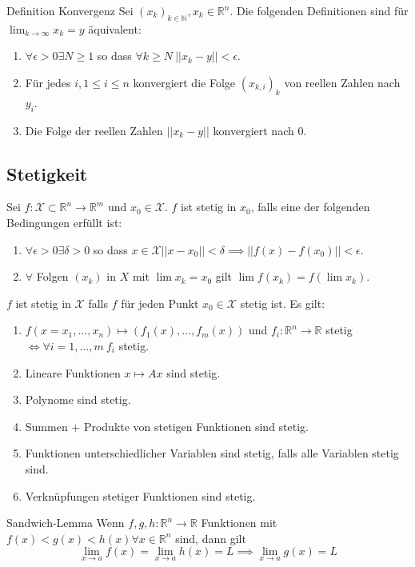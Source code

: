 \documentclass[a4paper,10pt]{article}
\def\R{\mathbb{R}}
\def\X{\mathcal{X}}
\begin{document}
\begin{mainbox}{Definition Konvergenz}
  Sei \((x_k)_{k \in \mathbb{N}}, x_k \in \R^n\). Die folgenden Definitionen sind für \(\lim_{k\to\infty}x_k = y\) äquivalent:
  \begin{enumerate}
    \item \(\forall \epsilon > 0 \exists N \ge 1\) so dass \(\forall k \ge N \ ||x_k - y|| < \epsilon\).
    \item Für jedes \(i, 1 \le i \le n\) konvergiert die Folge \((x_{k,i})_k\) von reellen Zahlen nach \(y_i\).
    \item Die Folge der reellen Zahlen \(||x_k - y||\) konvergiert nach \(0\).
  \end{enumerate}
\end{mainbox}
\subsection{Stetigkeit}
Sei \(f: \X \subset \R^n \to \R^m\)  und \(x_0 \in \X\). \(f\) ist stetig in \(x_0\), falls eine der folgenden Bedingungen erfüllt ist:
\begin{enumerate}
  \item \(\forall \epsilon > 0 \exists \delta > 0\) so dass \(x \in \X ||x - x_0|| < \delta \implies ||f(x) - f(x_0)|| < \epsilon\).
  \item \(\forall\) Folgen \((x_k)\) in \(X\) mit \(\lim x_k = x_0\) gilt \(\lim f(x_k) = f(\lim x_k)\).
\end{enumerate}
\(f\) ist stetig in \(\X\) falls \(f\) für jeden Punkt \(x_0 \in \X\) stetig ist. Es gilt:
\begin{enumerate}
  \item \(f(x = x_1, \ldots, x_n) \mapsto (f_1(x),\ldots,f_m(x))\) und \(f_i: \R^n \to \R\) stetig \(\iff \forall i = 1, \ldots, m \ f_i\) stetig.
  \item Lineare Funktionen \(x \mapsto Ax\) sind stetig.
  \item Polynome sind stetig.
  \item Summen + Produkte von stetigen Funktionen sind stetig.
  \item Funktionen unterschiedlicher Variablen sind stetig, falls alle Variablen stetig sind.
  \item Verknüpfungen stetiger Funktionen sind stetig.
\end{enumerate}
\begin{mainbox}{Sandwich-Lemma}
  Wenn \(f, g, h: \R^n \to \R\) Funktionen mit \(f(x) < g(x) < h(x) \forall x \in \R^n\) sind, dann gilt
  \[\lim_{x\to a} f(x) = \lim_{x \to a} h(x) = L \implies \lim_{x\to a} g(x) = L\]
\end{mainbox}
\end{document}
